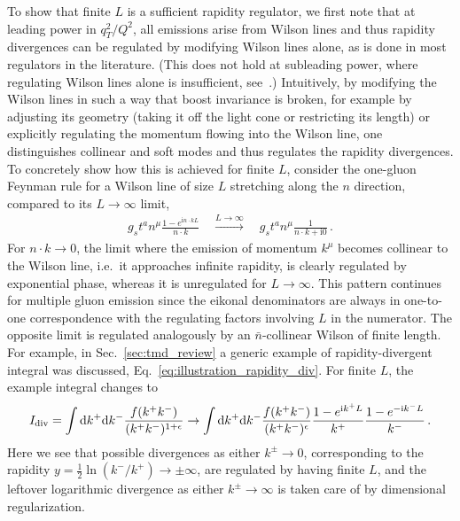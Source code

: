 \documentclass[11pt,a4paper]{article}
\DeclareRobustCommand{\eq}[1]{Eq.~\eqref{eq:#1}}
\DeclareRobustCommand{\sec}[1]{Sec.~\ref{sec:#1}}
\newcommand{\df}{\mathrm{d}}
\newcommand{\img}{\mathrm{i}}
\newcommand{\eps}{\epsilon}
\newcommand{\bn}{{\bar{n}}}
\begin{document}
To show that finite $L$ is a sufficient rapidity regulator, we first note that at leading power in $q_T^2/Q^2$, all emissions arise from Wilson lines and thus rapidity divergences can be regulated by modifying Wilson lines alone, as is done in most regulators in the literature.
(This does not hold at subleading power, where regulating Wilson lines alone is insufficient, see~\cite{Ebert:2018gsn}.)
Intuitively, by modifying the Wilson lines in such a way that boost invariance is broken,
for example by adjusting its geometry (taking it off the light cone or restricting its length)
or explicitly regulating the momentum flowing into the Wilson line,
one distinguishes collinear and soft modes and thus regulates the rapidity divergences.
To concretely show how this is achieved for finite $L$, consider the one-gluon Feynman rule for a Wilson line of size $L$ stretching along the $n$ direction, compared to its $L\to\infty$ limit,
\begin{align}
 g_s t^a n^\mu \frac{1 - e^{\img n \cdot k L}}{n \cdot k}
 \quad\stackrel{L\to\infty}{\longrightarrow}\quad
 g_s t^a n^\mu \frac{1}{n \cdot k + \img 0}
\,.\end{align}
For $n\cdot k\to0$, the limit where the emission of momentum $k^\mu$ becomes collinear to the Wilson line, i.e.\ it approaches infinite rapidity, is clearly regulated by exponential phase, whereas it is unregulated for $L\to\infty$.
This pattern continues for multiple gluon emission since the eikonal denominators are always in one-to-one correspondence with the regulating factors involving $L$ in the numerator.
The opposite limit is regulated analogously by an $\bn$-collinear Wilson of finite length.
For example, in \sec{tmd_review} a generic example of rapidity-divergent integral was discussed, \eq{illustration_rapidity_div}.
For finite $L$, the example integral changes to
\begin{align} \label{eq:illustration_rapidity_div_3}
 I_{\rm div} = \int \df k^+ \df k^- \frac{f(k^+ k^-)}{(k^+ k^-)^{1+\eps}}
 \to \int \df k^+ \df k^- \frac{f(k^+ k^-)}{(k^+ k^-)^{\eps}}
     \frac{1 - e^{\img k^+ L}}{k^+} \frac{1 - e^{- \img k^- L}}{k^-}
\,.\end{align}
Here we see that possible divergences as either $k^\pm \to 0$,
corresponding to the rapidity $y = \frac12 \ln(k^-/k^+) \to \pm \infty$, are regulated by having finite $L$,
and the leftover logarithmic divergence as either $k^\pm\to\infty$ is taken care of by dimensional regularization.
\end{document}
